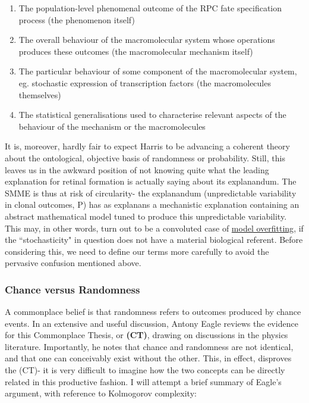 \begin{enumerate}
\item The population-level phenomenal outcome of the RPC fate specification process (the phenomenon itself)
\item The overall behaviour of the macromolecular system whose operations produces these outcomes (the macromolecular mechanism itself)
\item The particular behaviour of some component of the macromolecular system, eg. stochastic expression of transcription factors (the macromolecules themselves)
\item The statistical generalisations used to characterise relevant aspects of the behaviour of the mechanism or the macromolecules
\end{enumerate}

It is, moreover, hardly fair to expect Harris to be advancing a coherent theory about the ontological, objective basis of randomness or probability. Still, this leaves us in the awkward position of not knowing quite what the leading explanation for retinal formation is actually saying about its explanandum. The SMME is thus at risk of circularity- the explanandum (unpredictable variability in clonal outcomes, P) has as explanans a mechanistic explanation containing an abstract mathematical model tuned to produce this unpredictable variability. This may, in other words, turn out to be a convoluted case of \hyperref[fitting]{model overfitting}, if the ``stochasticity" in question does not have a material biological referent. Before considering this, we need to define our terms more carefully to avoid the pervasive confusion mentioned above.

\subsubsection{Chance versus Randomness}
A commonplace belief is that randomness refers to outcomes produced by chance events. In an extensive and useful discussion, Antony Eagle reviews the evidence for this Commonplace Thesis, or \textbf{(CT)}\cite{Eagle2018}, drawing on discussions in the physics literature. Importantly, he notes that chance and randomness are not identical, and that one can conceivably exist without the other. This, in effect, disproves the (CT)- it is very difficult to imagine how the two concepts can be directly related in this productive fashion. I will attempt a brief summary of Eagle's argument, with reference to Kolmogorov complexity:

